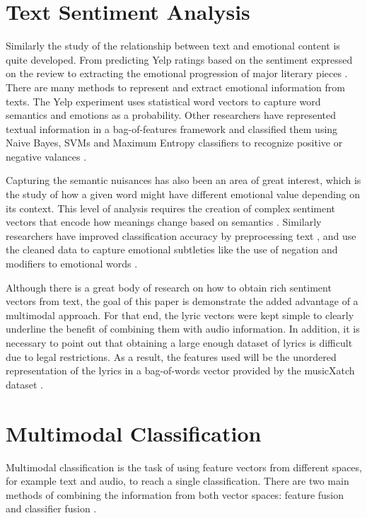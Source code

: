 \section{Text Sentiment Analysis}

Similarly the study of the relationship between text and emotional content is quite 
developed. From predicting Yelp ratings based on the sentiment expressed on the 
review \cite{YelpReview}  to extracting the emotional progression of major literary pieces \cite{transprose}.  
There are many methods to represent and extract emotional information from texts. 
The Yelp experiment uses statistical word vectors to capture word semantics and 
emotions as a probability.  Other researchers have represented textual information in 
a bag-of-features framework and classified them using Naive Bayes, SVMs and 
Maximum Entropy classifiers to recognize positive or negative valances \cite{Pang:2002:TUS:1118693.1118704}.  

Capturing the semantic nuisances has also been an area of great interest, which is 
the study of how a given word might have different emotional value depending on its 
context. This level of analysis requires the creation of complex sentiment vectors 
that encode how meanings change based on semantics \cite{Maas:2011:LWV:2002472.2002491}.  Similarly researchers 
have improved classification accuracy by preprocessing text \cite{Haddi201326}, and use the 
cleaned data to capture emotional subtleties like the use of negation and modifiers 
to emotional words \cite{Xia_sentimentvector}. 

Although there is a great body of research on how to obtain rich sentiment vectors 
from text, the goal of this paper is demonstrate the added advantage of a 
multimodal approach.  For that end, the lyric vectors were kept simple to clearly
underline the benefit of combining them with audio information.  In addition, it is necessary 
to point out that obtaining a large enough dataset of lyrics is difficult due to legal restrictions.   
As a result, the features used will be the unordered representation of the lyrics in 
a bag-of-words vector provided by the musicXatch dataset \cite{musicXmatchDataset}.

\section{Multimodal Classification}

Multimodal classification is the task of using feature vectors from different spaces, 
for example text and audio, to reach a single classification. There are two main 
methods of combining the information from both vector spaces: feature fusion and 
classifier fusion \cite{zhonga2012music}. 

